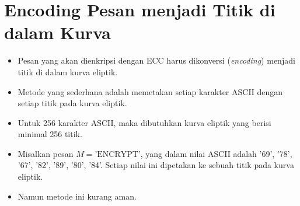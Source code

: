 \documentclass{article}
\begin{document}

\section*{Encoding Pesan menjadi Titik di dalam Kurva}

\begin{itemize}
    \item Pesan yang akan dienkripsi dengan ECC harus dikonversi (\textit{encoding}) menjadi titik di dalam kurva eliptik.
    \item Metode yang sederhana adalah memetakan setiap karakter ASCII dengan setiap titik pada kurva eliptik.
    \item Untuk 256 karakter ASCII, maka dibutuhkan kurva eliptik yang berisi minimal 256 titik.
    \item Misalkan pesan $M = \text{'ENCRYPT'}$, yang dalam nilai ASCII adalah '69', '78', '67', '82', '89', '80', '84'. Setiap nilai ini dipetakan ke sebuah titik pada kurva eliptik.
    \item Namun metode ini kurang aman.
\end{itemize}
\end{document}
